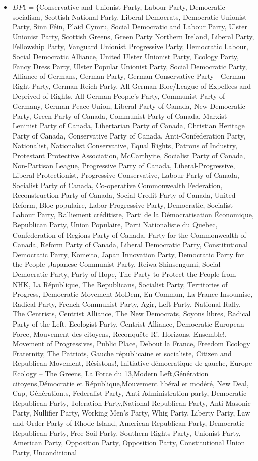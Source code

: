 \documentclass{classrep}
\begin{document}
\begin{itemize}
\item $DP1 = \{$Conservative and Unionist Party, Labour Party, Democratic socialism, Scottish National Party, Liberal Democrats, Democratic Unionist Party, Sinn Féin, Plaid Cymru, Social Democratic and Labour Party,	 Ulster Unionist Party, Scottish Greens, Green Party Northern Ireland, Liberal Party, Fellowship Party, Vanguard Unionist Progressive Party, Democratic Labour, Social Democratic Alliance, United Ulster Unionist Party, Ecology Party, Fancy Dress Party, Ulster Popular Unionist Party, Social Democratic Party, Alliance of Germans, German Party, German Conservative Party - German Right Party, German Reich Party, All-German Bloc/League of Expellees and Deprived of Rights, All-German People's Party, Communist Party of Germany, German Peace Union, Liberal Party of Canada, New Democratic Party, Green Party of Canada, Communist Party of Canada, Marxist–Leninist Party of Canada, Libertarian Party of Canada, Christian Heritage Party of Canada, Conservative Party of Canada, Anti-Confederation Party, Nationalist, Nationalist Conservative, Equal Rights, Patrons of Industry, Protestant Protective Association, McCarthyite, Socialist Party of Canada, Non-Partisan League, Progressive Party of Canada, Liberal-Progressive, Liberal Protectionist, Progressive-Conservative, Labour Party of Canada, Socialist Party of Canada, Co-operative Commonwealth Federation, Reconstruction Party of Canada, Social Credit Party of Canada, United Reform, Bloc populaire, Labor-Progressive Party, Democratic, Socialist Labour Party, Ralliement créditiste, Parti de la Démocratisation Économique, Republican Party, Union Populaire, Parti Nationaliste du Quebec, Confederation of Regions Party of Canada, Party for the Commonwealth of Canada, Reform Party of Canada, Liberal Democratic Party, Constitutional Democratic Party, Komeito, Japan Innovation Party, Democratic Party for the People ,Japanese Communist Party, Reiwa Shinsengumi, Social Democratic Party, Party of Hope, The Party to Protect the People from NHK, La République, The Republicans, Socialist Party, Territories of Progress, Democratic Movement	MoDem, En Commun, La France Insoumise, Radical Party, French Communist Party, Agir, Left Party, National Rally, The Centrists, Centrist Alliance, The New Democrats, Soyons libres, Radical Party of the Left, Ecologist Party, Centrist Alliance, Democratic European Force, Mouvement des citoyens, Reconquête	R!, Horizons, Ensemble!, Movement of Progressives, Public Place, Debout la France, Freedom Ecology Fraternity, The Patriots, Gauche républicaine et socialiste, Citizen and Republican Movement, Résistons!, Initiative démocratique de gauche, Europe Ecology – The Greens, La Force du 13,Modern Left,Génération citoyens,Démocratie et République,Mouvement libéral et modéré, New Deal, Cap, Génération.s, Federalist Party, Anti-Administration party, Democratic-Republican Party, Toleration Party,National Republican Party, Anti-Masonic Party, Nullifier Party, Working Men's Party, Whig Party, Liberty Party, Law and Order Party of Rhode Island, American Republican Party, Democratic-Republican Party, Free Soil Party, Southern Rights Party, Unionist Party, American Party, Opposition Party, Opposition Party, Constitutional Union Party, Unconditional 
\end{itemize}
\end{document}
